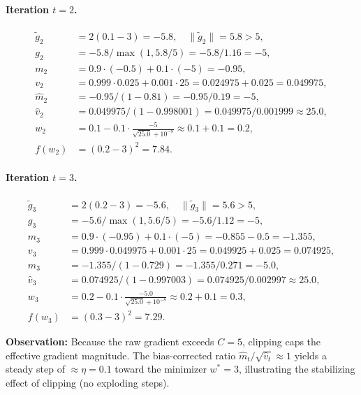 \documentclass[11pt]{article}
\begin{document}
\paragraph{Iteration $t=2$.}
\begin{align*}
\widetilde g_2 &= 2(0.1-3) = -5.8,\quad \|\widetilde g_2\|=5.8>5,\\
g_2 &= -5.8/\max(1,5.8/5) = -5.8/1.16 = -5,\\
m_2 &= 0.9\cdot(-0.5) + 0.1\cdot(-5) = -0.95,\\
v_2 &= 0.999\cdot 0.025 + 0.001\cdot 25 = 0.024975 + 0.025 = 0.049975,\\
\hat m_2 &= -0.95/(1-0.81) = -0.95/0.19 = -5,\\
\hat v_2 &= 0.049975/(1-0.998001) = 0.049975/0.001999 \approx 25.0,\\
w_2 &= 0.1 - 0.1\cdot\frac{-5}{\sqrt{25.0}+10^{-8}} \approx 0.1 + 0.1 = 0.2,\\
f(w_2) &= (0.2-3)^2 = 7.84.
\end{align*}

\paragraph{Iteration $t=3$.}
\begin{align*}
\widetilde g_3 &= 2(0.2-3) = -5.6,\quad \|\widetilde g_3\|=5.6>5,\\
g_3 &= -5.6/\max(1,5.6/5) = -5.6/1.12 = -5,\\
m_3 &= 0.9\cdot(-0.95) + 0.1\cdot(-5) = -0.855 - 0.5 = -1.355,\\
v_3 &= 0.999\cdot 0.049975 + 0.001\cdot 25 = 0.049925 + 0.025 = 0.074925,\\
\hat m_3 &= -1.355/(1-0.729) = -1.355/0.271 = -5.0,\\
\hat v_3 &= 0.074925/(1-0.997003) = 0.074925/0.002997 \approx 25.0,\\
w_3 &= 0.2 - 0.1\cdot\frac{-5.0}{\sqrt{25.0}+10^{-8}} \approx 0.2 + 0.1 = 0.3,\\
f(w_3) &= (0.3-3)^2 = 7.29.
\end{align*}

\noindent
\textbf{Observation:} Because the raw gradient exceeds $C=5$, clipping caps the effective
gradient magnitude. The bias-corrected ratio $\hat m_t/\sqrt{\hat v_t}\approx 1$ yields a
steady step of $\approx \eta = 0.1$ toward the minimizer $w^*=3$, illustrating the
stabilizing effect of clipping (no exploding steps).

\end{document}
